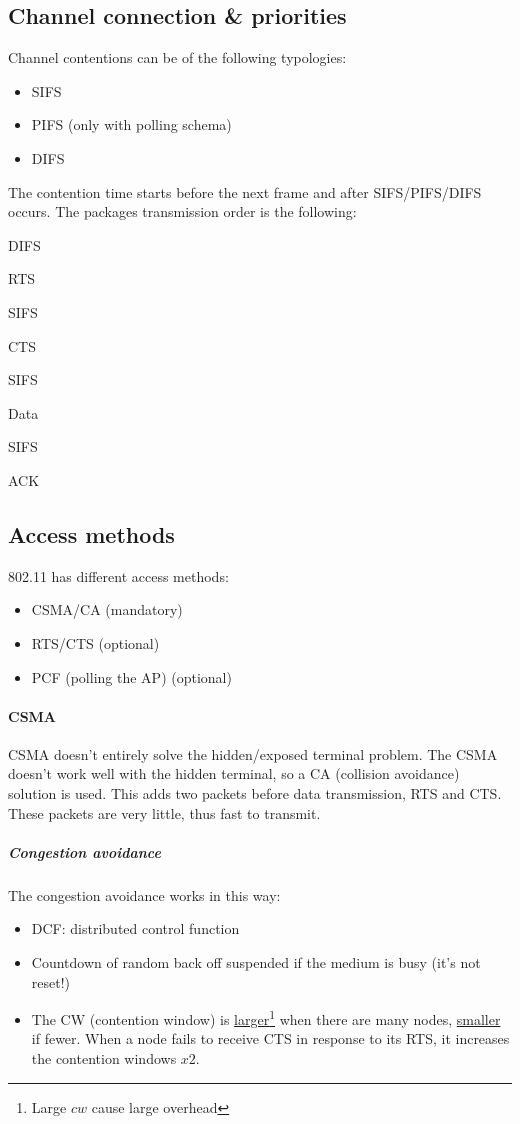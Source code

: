 \subsection{Channel connection \& priorities}
Channel contentions can be of the following typologies:
\begin{itemize}
\item SIFS
\item PIFS (only with polling schema)
\item DIFS
\end{itemize}

The contention time starts before the next frame and after SIFS/PIFS/DIFS
occurs.
The packages transmission order is the following:
\begin{AutoMultiColEnumerate}
\item DIFS
\item RTS
\item SIFS
\item CTS
\item SIFS
\item Data
\item SIFS
\item ACK
\end{AutoMultiColEnumerate}

\subsection{Access methods}
802.11 has different access methods:
\begin{itemize}
\item CSMA/CA (mandatory)
\item RTS/CTS (optional)
\item PCF (polling the AP) (optional)
\end{itemize}

\paragraph*{CSMA} CSMA doesn't entirely solve the hidden/exposed terminal
problem. The CSMA doesn't work well with the hidden terminal, so a CA
(collision avoidance) solution is used. This adds two packets before data
transmission, RTS and CTS. These packets are very little, thus fast to transmit.

\subparagraph*{Congestion avoidance} The congestion avoidance works in this way:
\begin{itemize}
\item DCF: distributed control function
\item Countdown of random back off suspended if the medium is busy (it's not
  reset!)
\item The CW (contention window) is \underline{larger}\footnote{Large $cw$ cause
  large overhead} when there are many nodes, \underline{smaller} if fewer. When
  a node fails to receive CTS in response to its RTS, it increases the
  contention windows $x2$.
\end{itemize}

